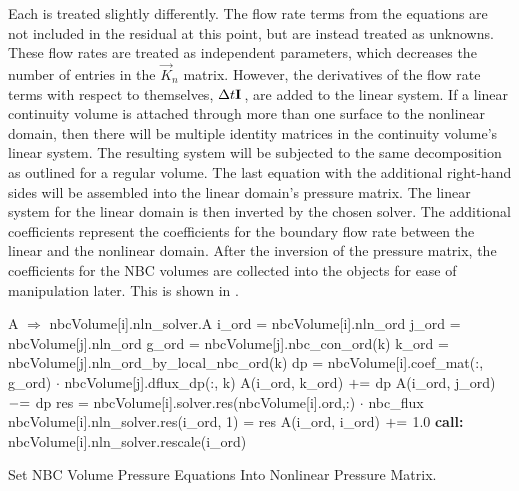Each  is treated slightly differently.
The flow rate terms from the equations are not included in the residual at this point, but are instead treated as unknowns.
These flow rates are treated as independent parameters, which decreases the number of entries in the $\vec{K}_{n}$ matrix.
However, the derivatives of the flow rate terms with respect to themselves, $\dt{} \vec{I}$, are added to the linear system.
If a linear continuity volume is attached through more than one surface to the nonlinear domain, then there will be multiple identity matrices in the continuity volume's linear system.
The resulting system will be subjected to the same  decomposition as outlined for a regular volume.
The last equation with the additional right-hand sides will be assembled into the linear domain's pressure matrix.
The linear system for the linear domain is then inverted by the chosen solver.
The additional coefficients represent the coefficients for the boundary flow rate between the linear and the nonlinear domain.
After the inversion of the pressure matrix, the coefficients for the NBC volumes are collected into the  objects for ease of manipulation later.
This is shown in .

\begin{algo}[ht!]
\setlength{\baselineskip}{0.625\baselineskip}
\begin{algorithmic}[1]
	\Set A $\Rightarrow$ nbcVolume[i].nln\_solver.A
	\Set i\_ord = nbcVolume[i].nln\_ord
		\Set j\_ord = nbcVolume[j].nln\_ord
			\Set g\_ord = nbcVolume[j].nbc\_con\_ord(k)
			\Set k\_ord = nbcVolume[j].nln\_ord\_by\_local\_nbc\_ord(k)
			\Set dp = nbcVolume[i].coef\_mat(:, g\_ord) $\cdot$ nbcVolume[j].dflux\_dp(:, k)
			\Set A(i\_ord, k\_ord) $\mathrel{+}=$ dp
			\Set A(i\_ord, j\_ord) $\mathrel{-}=$ dp
		\EndFor
	\EndFor
	\Set res = nbcVolume[i].solver.res(nbcVolume[i].ord,:) $\cdot$ nbc\_flux
	\Set nbcVolume[i].nln\_solver.res(i\_ord, 1) = res
	\Set A(i\_ord, i\_ord) $\mathrel{+}=$ 1.0
	\State \textbf{call:} nbcVolume[i].nln\_solver.rescale(i\_ord)
\EndFor
\end{algorithmic}
\caption{Set NBC Volume Pressure Equations Into Nonlinear Pressure Matrix.}
\label{alg:domDecompSetMat}
\end{algo}

